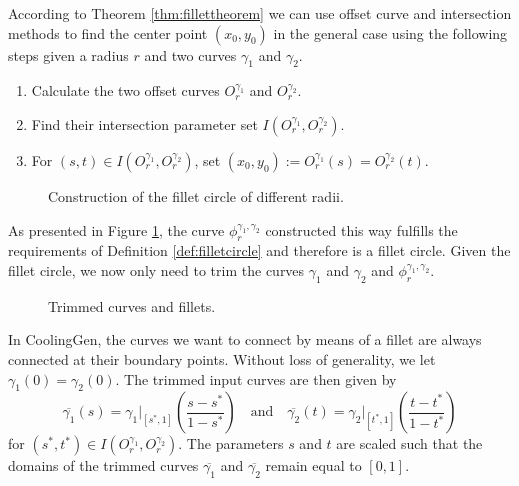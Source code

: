\documentclass[a4paper, 11pt]{report}
\theoremstyle{definition}
\newcommand{\domrestr}{\big|}
\begin{document}
	According to Theorem \ref{thm:fillettheorem} we can use offset curve and intersection methods to find the center point $(x_0, y_0)$ in the general case using the following steps given a radius $r$ and two curves $\gamma_1$ and $\gamma_2$.
	\begin{enumerate}
		\item Calculate the two offset curves $O^{\gamma_1}_r$ and $O^{\gamma_2}_r$.
		\item Find their intersection parameter set $I(O^{\gamma_1}_r, O^{\gamma_2}_r)$.
		\item For $(s,t) \in I(O^{\gamma_1}_r, O^{\gamma_2}_r)$, set $(x_0, y_0) := O^{\gamma_1}_r(s) = O^{\gamma_2}_r(t)$.
	\end{enumerate}

	\begin{figure}[H]
		\centering
		
		\caption{Construction of the fillet circle of different radii.}
		\label{fig:filletconstruction}
	\end{figure}

	As presented in Figure \ref{fig:filletconstruction}, the curve $\phi^{\gamma_1, \gamma_2}_r$ constructed this way fulfills the requirements of Definition \ref{def:filletcircle} and therefore is a fillet circle. Given the fillet circle, we now only need to trim the curves $\gamma_1$ and $\gamma_2$ and $\phi^{\gamma_1, \gamma_2}_r$.

	\begin{figure}[H]
		\centering
		
		\caption{Trimmed curves and fillets.}
	\end{figure}

	In CoolingGen, the curves we want to connect by means of a fillet are always connected at their boundary points. Without loss of generality, we let $\gamma_1(0) = \gamma_2(0)$. The trimmed input curves are then given by
		$$
			\overline{\gamma_1}(s) = \gamma_1 \domrestr_{[s^*,1]}\left(\frac{s-s^*}{1-s^*}\right) 
			\quad\text{and}\quad
			\overline{\gamma_2}(t) = \gamma_2 \domrestr_{[t^*,1]}\left(\frac{t-t^*}{1-t^*}\right) 
		$$
	for $(s^*,t^*) \in I(O^{\gamma_1}_r, O^{\gamma_2}_r)$. The parameters $s$ and $t$ are scaled such that the domains of the trimmed curves $\overline{\gamma_1}$ and $\overline{\gamma_2}$ remain equal to $[0,1]$.
\end{document}
